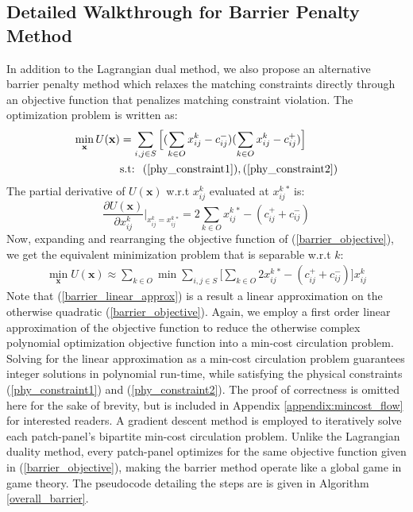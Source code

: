 \documentclass[sigconf]{acmart}
\theoremstyle{definition}
\begin{document}
\begin{appendices}
\subsection{Detailed Walkthrough for Barrier Penalty Method}
In addition to the Lagrangian dual method, we also propose an alternative barrier penalty method which relaxes the matching constraints directly through an objective function that penalizes matching constraint violation. The optimization problem is written as:
\begin{equation}\label{barrier_objective}
\begin{aligned}
\min\limits_{\mathbf{x}} U(\mathbf{x}) & = \sum_{i, j \in S}\Big[(\sum_{k \in O}x_{ij}^k - c_{ij}^-)(\sum_{k \in O}x_{ij}^k - c_{ij}^+)\Big]\\
& \text{s.t: } \; (\ref{phy_constraint1}), (\ref{phy_constraint2})
\end{aligned}
\end{equation}
The partial derivative of $U(\mathbf{x})$ w.r.t $x_{ij}^k$ evaluated at $x_{ij}^k{}^*$ is: 
\begin{equation}\label{barrier_partial_derivative}
    \frac{\partial U(\mathbf{x})}{\partial x_{ij}^k}\bigg|_{x_{ij}^k = x_{ij}^k{}^*} = 2\sum\limits_{k \in O}x_{ij}^k{}^* - (c_{ij}^+ + c_{ij}^-)
\end{equation}
Now, expanding and rearranging the objective function of (\ref{barrier_objective}), we get the equivalent minimization problem that is separable w.r.t $k$:
\begin{equation}
\begin{aligned}
\min\limits_{\mathbf{x}} U(\mathbf{x}) \approx \sum\limits_{k \in O} \min \sum\limits_{i, j \in S} \big[\sum\limits_{k \in O}2x_{ij}^k{}^* - (c_{ij}^+ + c_{ij}^-)\big]x_{ij}^k
\end{aligned}\label{barrier_linear_approx}
\end{equation}
Note that (\ref{barrier_linear_approx}) is a result a linear approximation on the otherwise quadratic (\ref{barrier_objective}). Again, we employ a first order linear approximation of the objective function to reduce the otherwise complex polynomial optimization objective function into a min-cost circulation problem. Solving for the linear approximation as a min-cost circulation problem guarantees integer solutions in polynomial run-time, while satisfying the physical constraints (\ref{phy_constraint1}) and (\ref{phy_constraint2}). The proof of correctness is omitted here for the sake of brevity, but is included in Appendix \ref{appendix:mincost_flow} for interested readers. A gradient descent method is employed to iteratively solve each patch-panel's bipartite min-cost circulation problem. Unlike the Lagrangian duality method, every patch-panel optimizes for the same objective function given in (\ref{barrier_objective}), making the barrier method operate like a global game in game theory. The pseudocode detailing the steps are is given in Algorithm \ref{overall_barrier}.


\end{appendices}
\end{document}
